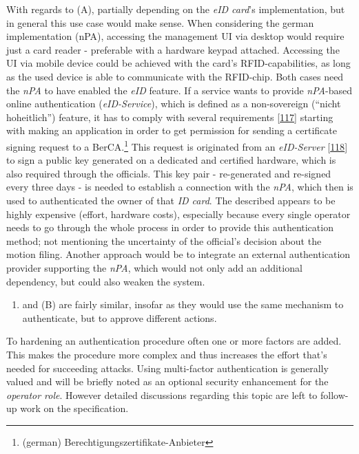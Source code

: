 \documentclass[12pt,english,a4paper,titlepage,cleardoublepage=empty,dottedtoc]{report}
\providecommand{\tightlist}{%
  \setlength{\itemsep}{0pt}\setlength{\parskip}{0pt}}
\begin{document}
With regards to (A), partially depending on the \emph{eID card}'s
implementation, but in general this use case would make sense. When
considering the german implementation (nPA), accessing the management UI
via desktop would require just a card reader - preferable with a
hardware keypad attached. Accessing the UI via mobile device could be
achieved with the card's RFID-capabilities, as long as the used device
is able to communicate with the RFID-chip. Both cases need the
\emph{nPA} to have enabled the \emph{eID} feature. If a service wants to
provide \emph{nPA}-based online authentication (\emph{eID-Service}),
which is defined as a non-sovereign (``nicht hoheitlich'') feature, it
has to comply with several requirements
{[}\protect\hyperlink{ref-web_bsi-spec_eid}{117}{]} starting with making
an application in order to get permission for sending a certificate
signing request to a BerCA.\footnote{(german)
  Berechtigungszertifikate-Anbieter} This request is originated from an
\emph{eID-Server}
{[}\protect\hyperlink{ref-web_2017_npa-eid-server}{118}{]} to sign a
public key generated on a dedicated and certified hardware, which is
also required through the officials. This key pair - re-generated and
re-signed every three days - is needed to establish a connection with
the \emph{nPA}, which then is used to authenticated the owner of that
\emph{ID card}. The described appears to be highly expensive (effort,
hardware costs), especially because every single operator needs to go
through the whole process in order to provide this authentication
method; not mentioning the uncertainty of the official's decision about
the motion filing. Another approach would be to integrate an external
authentication provider supporting the \emph{nPA}, which would not only
add an additional dependency, but could also weaken the system.

\begin{enumerate}
\def\labelenumi{(\Alph{enumi})}
\tightlist
\item
  and (B) are fairly similar, insofar as they would use the same
  mechanism to authenticate, but to approve different actions.
\end{enumerate}

To hardening an authentication procedure often one or more factors are
added. This makes the procedure more complex and thus increases the
effort that's needed for succeeding attacks. Using multi-factor
authentication is generally valued and will be briefly noted as an
optional security enhancement for the \emph{operator role}. However
detailed discussions regarding this topic are left to follow-up work on
the specification.
\end{document}
